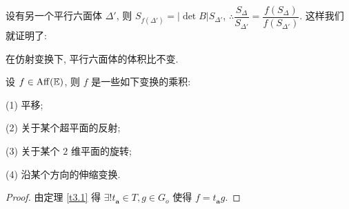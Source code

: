 \documentclass[color=black,device=normal,lang=cn,mode=geye]{elegantnote}
\begin{document}
设有另一个平行六面体 $\Delta'$, 则 $S_{f(\Delta')}=|\det B|S_{\Delta'}$, $\therefore\dfrac{S_{\Delta}}{S_{\Delta'}}=\dfrac{f(S_{\Delta})}{f(S_{\Delta'})}$. 这样我们就证明了:
\begin{theorem}
    在仿射变换下, 平行六面体的体积比不变.
\end{theorem}
\begin{theorem}[书上的定理 11]
    设 $f\in\operatorname{Aff} (\mathbb{E})$, 则 $f$ 是一些如下变换的乘积:

    (1) 平移;
    
    (2) 关于某个超平面的反射;

    (3) 关于某个 $2$ 维平面的旋转;

    (4) 沿某个方向的伸缩变换.
\end{theorem}
\begin{proof}
    由定理 \ref{t3.1} 得 $\exists!t_{\boldsymbol{a}}\in T,g\in G_{\dot{o}}$ 使得 $f=t_{\boldsymbol{a}}g$.


\end{proof}
\end{document}
